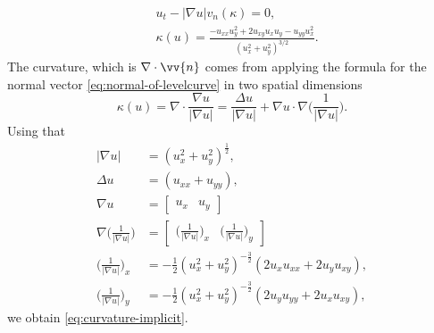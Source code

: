 \begin{align}
    &u_t - |\nabla u|v_n(\kappa) = 0, \\
    &\kappa(u) = \frac{-u_{xx}u_y^2+2u_{xy}u_xu_y - u_{yy}u_x^2}{(u_x^2+u_y^2)^{3/2}}. \label{eq:curvature-implicit}
\end{align}
The curvature, which is $\nabla \cdot \vv{n}$ comes from applying the formula for the normal vector \eqref{eq:normal-of-levelcurve} in two spatial dimensions
\begin{equation}
    \kappa(u) = \nabla \cdot \frac{\nabla u}{|\nabla u|} = \frac{\Delta u}{|\nabla u|}+\nabla u \cdot \nabla\bigg(\frac{1}{|\nabla u|}\bigg).
\end{equation}
Using that 
\begin{align*}
    |\nabla u| &= (u_x^2+u_y^2)^{\frac{1}{2}},\\
    \Delta u &= (u_{xx} + u_{yy}),\\
    \nabla u &= \begin{bmatrix}u_x & u_y \end{bmatrix} \\
    \nabla \bigg( \frac{1}{|\nabla u|} \bigg) &= \begin{bmatrix}\bigg( \frac{1}{|\nabla u|} \bigg)_x & \bigg( \frac{1}{|\nabla u|} \bigg)_y \end{bmatrix} \\
    \bigg( \frac{1}{|\nabla u|} \bigg)_x &= -\frac{1}{2} (u_x^2+u_y^2)^{-\frac{3}{2}}(2u_x u_{xx}+2u_y u_{xy}), \\
    \bigg( \frac{1}{|\nabla u|} \bigg)_y &= -\frac{1}{2} (u_x^2+u_y^2)^{-\frac{3}{2}}(2u_y u_{yy}+2u_x u_{xy}),
\end{align*}
we obtain \eqref{eq:curvature-implicit}.

